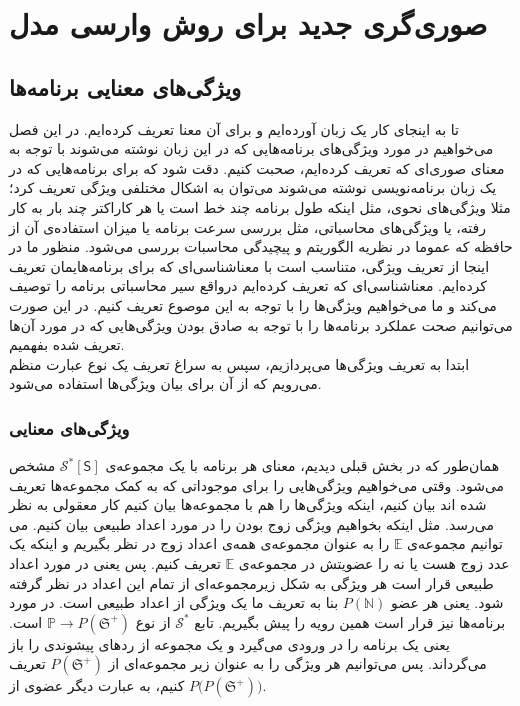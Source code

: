 
\chapter{صوری‌گری جدید برای روش وارسی مدل}

\section{ویژگی‌های معنایی برنامه‌ها}
تا به اینجای کار یک زبان آورده‌ایم و برای آن معنا تعریف کرده‌ایم. در این فصل می‌خواهیم در مورد ویژگی‌های برنامه‌هایی که در این زبان نوشته می‌شوند با توجه به معنای صوری‌ای که تعریف کرده‌ایم، صحبت کنیم. دقت شود که برای برنامه‌هایی که در یک زبان برنامه‌نویسی نوشته می‌شوند می‌توان به اشکال مختلفی ویژگی تعریف کرد؛ مثلا ویژگی‌های نحوی، مثل اینکه طول برنامه چند خط است یا هر کاراکتر چند بار به کار رفته، یا ویژگی‌های محاسباتی، مثل بررسی‌ سرعت برنامه یا میزان استفاده‌ی آن از حافظه که عموما در نظریه الگوریتم و پیچیدگی محاسبات بررسی می‌شود. منظور ما در اینجا از تعریف ویژگی، متناسب است با معناشناسی‌ای که برای برنامه‌هایمان تعریف کرده‌ایم. معناشناسی‌ای که تعریف کرده‌ایم درواقع سیر محاسباتی برنامه را توصیف می‌کند و ما می‌خواهیم ویژگی‌ها را با توجه به این موصوع تعریف کنیم. در این صورت می‌توانیم صحت عملکرد برنامه‌ها را با توجه به صادق بودن ویژگی‌هایی که در مورد آن‌ها تعریف شده بفهمیم.\\
ابتدا به تعریف ویژگی‌ها می‌پردازیم، سپس به سراغ تعریف یک نوع عبارت منظم می‌رویم که از آن برای بیان ویژگی‌ها استفاده می‌شود.
\subsection{ویژگی‌های معنایی}
همان‌طور که در بخش قبلی دیدیم، معنای هر برنامه با یک مجموعه‌ی 
$\mathcal{S^*} [\mathsf{S}]$
مشخص می‌شود. وقتی می‌خواهیم ویژگی‌هایی را برای موجوداتی که به کمک مجموعه‌ها تعریف شده اند بیان کنیم، اینکه ویژگی‌ها را هم با مجموعه‌ها بیان کنیم کار معقولی به نظر می‌رسد. مثل اینکه بخواهیم ویژگی زوج بودن را در مورد اعداد طبیعی بیان کنیم. می توانیم مجموعه‌ی $\mathbb{E}$ را به عنوان مجموعه‌ی همه‌ی اعداد زوج در نظر بگیریم و اینکه یک عدد زوج هست یا نه را عضویتش در مجموعه‌ی $\mathbb{E}$ تعریف کنیم. پس یعنی در مورد اعداد طبیعی قرار است هر ویژگی به شکل زیرمجموعه‌ای از تمام این اعداد در نظر گرفته شود. یعنی هر عضو 
$\mathit{P}(\mathbb{N})$
بنا به تعریف ما یک ویژگی از اعداد طبیعی است.
در مورد برنامه‌ها نیز قرار است همین رویه را پیش بگیریم. تابع 
$\mathcal{S^*}$
از نوع 
$\mathbb{P} \rightarrow \mathit{P}(\mathfrak{S^+})$
است. یعنی یک برنامه را در ورودی می‌گیرد و یک مجموعه از ردهای پیشوندی را باز می‌گرداند. پس می‌توانیم هر ویژگی را به عنوان زیر مجموعه‌ای از 
$\mathit{P}(\mathfrak{S^+})$
تعریف کنیم، به عبارت دیگر عضوی از
$\mathit{P(P}(\mathfrak{S^+}))$.

